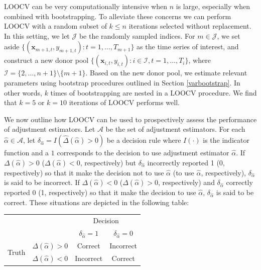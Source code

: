 \documentclass[11pt]{article}
\def\mbf#1{\mathbf{#1}} %
\def\mc#1{\mathcal{#1}} %
\theoremstyle{definition}
\begin{document}
LOOCV can be very computationally intensive when $n$ is large, especially when combined with bootstrapping. To alleviate these concerns we can perform LOOCV with a random subset of $k \leq n$ iterations selected without replacement. In this setting, we let $\mc{J}$ be the randomly sampled indices. For $m \in \mc{J}$, we set aside $\{(\mbf{x}_{m + 1, t}, y_{m + 1, t}) \colon t = 1, \ldots, T_{m+1}\}$ as the time series of interest, and construct a new donor pool $\{(\mbf{x}_{i, t}, y_{i, t}) \colon i \in \mc{I}, t = 1, \ldots, T_{i}\}$, where $\mc{I}=\{2, \ldots, n+1\} \setminus \{m+1\}$. Based on the new donor pool, we estimate relevant parameters using bootstrap procedures outlined in Section \ref{varbootstrap}. In other words, $k$ times of bootstrapping are nested in a LOOCV procedure.  We find that $k=5$ or $k=10$ iterations of LOOCV performs well.

We now outline how LOOCV can be used to prospectively assess the performance of adjustment estimators. Let $\mc{A}$ be the set of adjustment estimators. For each $\hat{\alpha} \in \mc{A}$, let $\delta_{\hat{\alpha}} = I(\hat\Delta(\hat{\alpha})>0)$ be a decision rule where $I(\cdot)$ is the indicator function and a $1$ corresponds to the decision to use adjustment estimator $\hat\alpha$. If $\Delta(\hat{\alpha})>0$ ($\Delta(\hat{\alpha})<0$, respectively) but $\delta_{\hat{\alpha}}$ incorrectly reported 1 (0, respectively) so that it make the decision not to use $\hat{\alpha}$ (to use $\hat{\alpha}$, respectively), $\delta_{\hat{\alpha}}$ is said to be incorrect. If $\Delta(\hat{\alpha})<0$ ($\Delta(\hat{\alpha})>0$, respectively) and  $\delta_{\hat{\alpha}}$ correctly reported 0 (1, respectively) so that it make the decision to use $\hat{\alpha}$, $\delta_{\hat{\alpha}}$ is said to be correct. These situations are depicted in the following table: \vspace*{0.3cm}

\begin{center}
  \begin{center}
      \begin{tabular}{cc|c|c}
        \hline
        & & \multicolumn{2}{c}{Decision} \\
        & & $\delta_{\hat{\alpha}} = 1$ & $\delta_{\hat{\alpha}} = 0$ \\ 
                \hline
     \multirow{2}{*}{Truth}  & $\Delta(\hat{\alpha})>0$ & Correct & Incorrect \\
      \cline{3-4}
      & $\Delta(\hat{\alpha})<0$  & Incorrect & Correct \\
      \hline
      \end{tabular}
  \end{center}
\end{center}
\vspace*{0.3cm}
\end{document}
